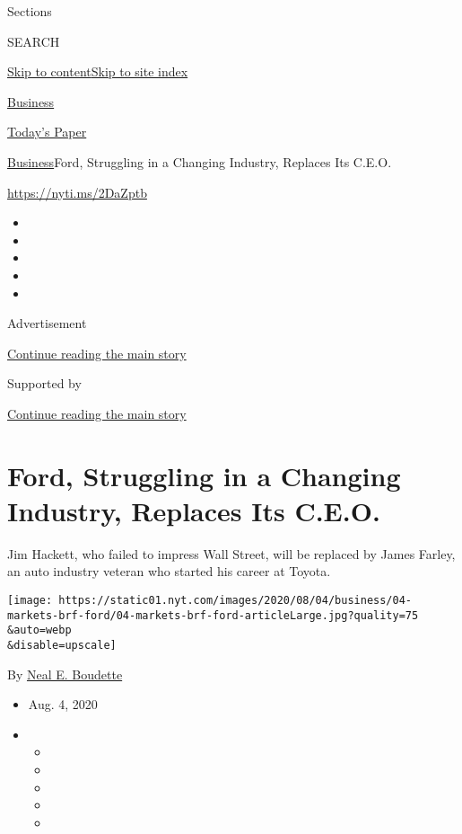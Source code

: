 Sections

SEARCH

\protect\hyperlink{site-content}{Skip to
content}\protect\hyperlink{site-index}{Skip to site index}

\href{https://www.nytimes.com/section/business}{Business}

\href{https://myaccount.nytimes.com/auth/login?response_type=cookie\&client_id=vi}{}

\href{https://www.nytimes.com/section/todayspaper}{Today's Paper}

\href{/section/business}{Business}\textbar{}Ford, Struggling in a
Changing Industry, Replaces Its C.E.O.

\url{https://nyti.ms/2DaZptb}

\begin{itemize}
\item
\item
\item
\item
\item
\end{itemize}

Advertisement

\protect\hyperlink{after-top}{Continue reading the main story}

Supported by

\protect\hyperlink{after-sponsor}{Continue reading the main story}

\hypertarget{ford-struggling-in-a-changing-industry-replaces-its-ceo}{%
\section{Ford, Struggling in a Changing Industry, Replaces Its
C.E.O.}\label{ford-struggling-in-a-changing-industry-replaces-its-ceo}}

Jim Hackett, who failed to impress Wall Street, will be replaced by
James Farley, an auto industry veteran who started his career at Toyota.

\texttt{[image: https://static01.nyt.com/images/2020/08/04/business/04-markets-brf-ford/04-markets-brf-ford-articleLarge.jpg?quality=75\\\&auto=webp\\\&disable=upscale]}

By \href{https://www.nytimes.com/by/neal-e-boudette}{Neal E. Boudette}

\begin{itemize}
\item
  Aug. 4, 2020
\item
  \begin{itemize}
  \item
  \item
  \item
  \item
  \item
  \end{itemize}
\end{itemize}

